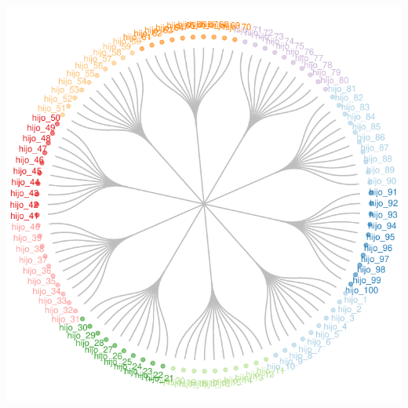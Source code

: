 \documentclass{article}\usepackage[]{graphicx}\usepackage[]{color}
\makeatletter
\def\maxwidth{ %
  \ifdim\Gin@nat@width>\linewidth
    \linewidth
  \else
    \Gin@nat@width
  \fi
}
\newenvironment{knitrout}{}{} %
\makeatother
\begin{document}
\begin{knitrout}
\color{fgcolor}

{\centering \includegraphics[width=\maxwidth]{figure/grafo_ggrpah-1} 

}



\end{knitrout}
\clearpage
\end{document}
